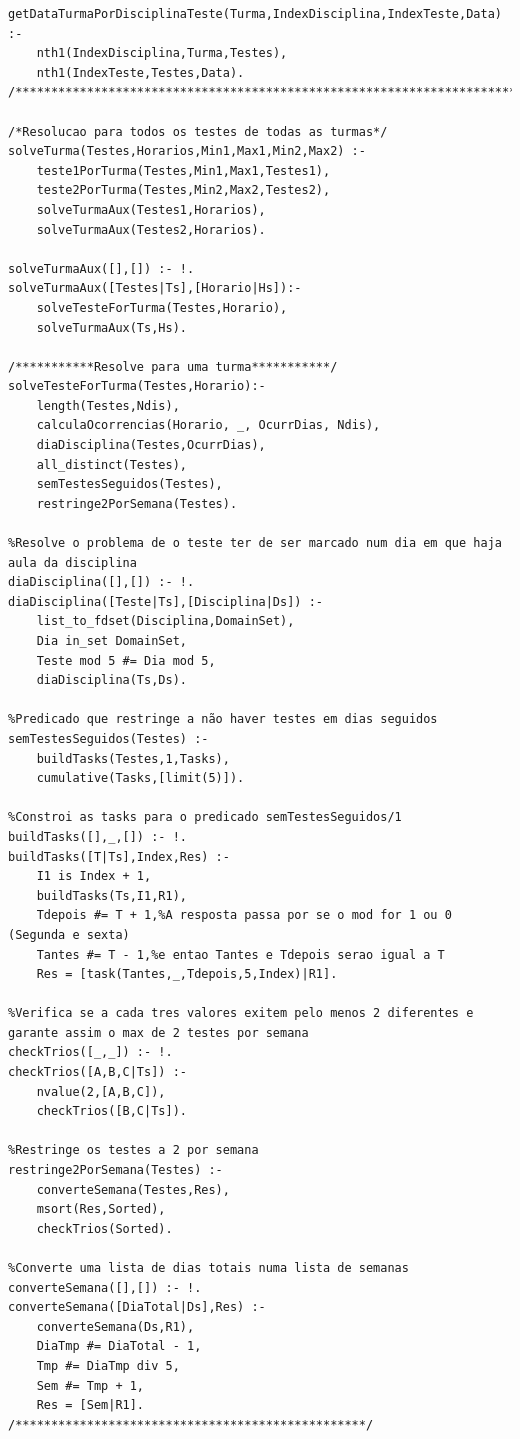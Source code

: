 \documentclass{llncs}
\newenvironment{changemargin}[2]{%
\begin{list}{}{%
\setlength{\topsep}{0pt}%
\setlength{\leftmargin}{#1}%
\setlength{\rightmargin}{#2}%
\setlength{\listparindent}{\parindent}%
\setlength{\itemindent}{\parindent}%
\setlength{\parsep}{\parskip}%
}%
\item[]}{
\end{list}}
\begin{document}
\begin{changemargin}{-3cm}{-4cm}
\begin{verbatim}
getDataTurmaPorDisciplinaTeste(Turma,IndexDisciplina,IndexTeste,Data) :-
    nth1(IndexDisciplina,Turma,Testes),
    nth1(IndexTeste,Testes,Data).
/*************************************************************************/

/*Resolucao para todos os testes de todas as turmas*/
solveTurma(Testes,Horarios,Min1,Max1,Min2,Max2) :-
    teste1PorTurma(Testes,Min1,Max1,Testes1),
    teste2PorTurma(Testes,Min2,Max2,Testes2),
    solveTurmaAux(Testes1,Horarios),
    solveTurmaAux(Testes2,Horarios).

solveTurmaAux([],[]) :- !.
solveTurmaAux([Testes|Ts],[Horario|Hs]):-
    solveTesteForTurma(Testes,Horario),
    solveTurmaAux(Ts,Hs).

/***********Resolve para uma turma***********/
solveTesteForTurma(Testes,Horario):-
    length(Testes,Ndis),
    calculaOcorrencias(Horario, _, OcurrDias, Ndis),
    diaDisciplina(Testes,OcurrDias),
    all_distinct(Testes),
    semTestesSeguidos(Testes),
    restringe2PorSemana(Testes).

%Resolve o problema de o teste ter de ser marcado num dia em que haja aula da disciplina
diaDisciplina([],[]) :- !.
diaDisciplina([Teste|Ts],[Disciplina|Ds]) :-
    list_to_fdset(Disciplina,DomainSet),
    Dia in_set DomainSet,
    Teste mod 5 #= Dia mod 5,
    diaDisciplina(Ts,Ds).

%Predicado que restringe a não haver testes em dias seguidos
semTestesSeguidos(Testes) :-
    buildTasks(Testes,1,Tasks),
    cumulative(Tasks,[limit(5)]).

%Constroi as tasks para o predicado semTestesSeguidos/1
buildTasks([],_,[]) :- !.
buildTasks([T|Ts],Index,Res) :-
    I1 is Index + 1,
    buildTasks(Ts,I1,R1),
    Tdepois #= T + 1,%A resposta passa por se o mod for 1 ou 0 (Segunda e sexta)
    Tantes #= T - 1,%e entao Tantes e Tdepois serao igual a T
    Res = [task(Tantes,_,Tdepois,5,Index)|R1].

%Verifica se a cada tres valores exitem pelo menos 2 diferentes e garante assim o max de 2 testes por semana
checkTrios([_,_]) :- !.
checkTrios([A,B,C|Ts]) :-
    nvalue(2,[A,B,C]),
    checkTrios([B,C|Ts]).

%Restringe os testes a 2 por semana
restringe2PorSemana(Testes) :-
    converteSemana(Testes,Res),
    msort(Res,Sorted),
    checkTrios(Sorted).

%Converte uma lista de dias totais numa lista de semanas
converteSemana([],[]) :- !.
converteSemana([DiaTotal|Ds],Res) :-
    converteSemana(Ds,R1),
    DiaTmp #= DiaTotal - 1,
    Tmp #= DiaTmp div 5,
    Sem #= Tmp + 1,
    Res = [Sem|R1].
/*************************************************/


\end{verbatim}
\end{changemargin}
\end{document}
